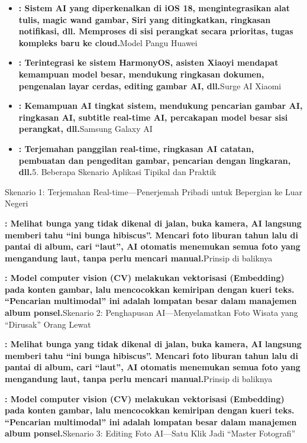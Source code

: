 \begin{itemize}
  \item \textbf{: Sistem AI yang diperkenalkan di iOS 18, mengintegrasikan alat tulis, magic wand gambar, Siri yang ditingkatkan, ringkasan notifikasi, dll. Memproses di sisi perangkat secara prioritas, tugas kompleks baru ke cloud.}Model Pangu Huawei
  \item \textbf{: Terintegrasi ke sistem HarmonyOS, asisten Xiaoyi mendapat kemampuan model besar, mendukung ringkasan dokumen, pengenalan layar cerdas, editing gambar AI, dll.}Surge AI Xiaomi
  \item \textbf{: Kemampuan AI tingkat sistem, mendukung pencarian gambar AI, ringkasan AI, subtitle real-time AI, percakapan model besar sisi perangkat, dll.}Samsung Galaxy AI
  \item \textbf{: Terjemahan panggilan real-time, ringkasan AI catatan, pembuatan dan pengeditan gambar, pencarian dengan lingkaran, dll.}5. Beberapa Skenario Aplikasi Tipikal dan Praktik
\end{itemize}


Skenario 1: Terjemahan Real-time—Penerjemah Pribadi untuk Bepergian ke Luar Negeri


\textbf{: Melihat bunga yang tidak dikenal di jalan, buka kamera, AI langsung memberi tahu “ini bunga hibiscus”. Mencari foto liburan tahun lalu di pantai di album, cari “laut”, AI otomatis menemukan semua foto yang mengandung laut, tanpa perlu mencari manual.}Prinsip di baliknya

\textbf{: Model computer vision (CV) melakukan vektorisasi (Embedding) pada konten gambar, lalu mencocokkan kemiripan dengan kueri teks. “Pencarian multimodal” ini adalah lompatan besar dalam manajemen album ponsel.}Skenario 2: Penghapusan AI—Menyelamatkan Foto Wisata yang “Dirusak” Orang Lewat


\textbf{: Melihat bunga yang tidak dikenal di jalan, buka kamera, AI langsung memberi tahu “ini bunga hibiscus”. Mencari foto liburan tahun lalu di pantai di album, cari “laut”, AI otomatis menemukan semua foto yang mengandung laut, tanpa perlu mencari manual.}Prinsip di baliknya

\textbf{: Model computer vision (CV) melakukan vektorisasi (Embedding) pada konten gambar, lalu mencocokkan kemiripan dengan kueri teks. “Pencarian multimodal” ini adalah lompatan besar dalam manajemen album ponsel.}Skenario 3: Editing Foto AI—Satu Klik Jadi “Master Fotografi”

